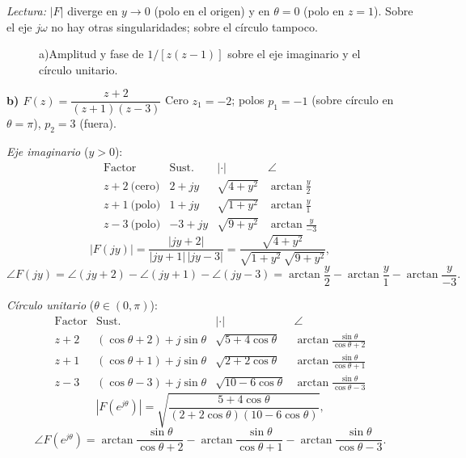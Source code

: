\documentclass[10pt,a4paper]{article}
\begin{document}
\noindent\textit{Lectura:} $|F|$ diverge en $y\to 0$ (polo en el origen) y en $\theta=0$ (polo en $z=1$). Sobre el eje $j\omega$ no hay otras singularidades; sobre el círculo tampoco.

\begin{figure}[H]\centering
	
	\caption{a)\enspace Amplitud y fase de $1/[z(z-1)]$ sobre el eje imaginario y el círculo unitario.}
	\label{fig:resp16a}
\end{figure}

\bigskip

\noindent\textbf{b) $F(z)=\dfrac{z+2}{(z+1)(z-3)}$}\;\textemdash\; Cero $z_1=-2$; polos $p_1=-1$ (sobre círculo en $\theta=\pi$), $p_2=3$ (fuera).

\medskip
\noindent\textit{Eje imaginario} ($y>0$):
\[
	\renewcommand{\arraystretch}{1.3}
	\begin{array}{l|c|c|c}
	\text{Factor} & \text{Sust.} & |\cdot| & \angle \\\hline
	z+2\ \text{(cero)}  & 2+jy  & \sqrt{4+y^2} & \arctan\tfrac{y}{2} \\
	z+1\ \text{(polo)}  & 1+jy  & \sqrt{1+y^2} & \arctan\tfrac{y}{1} \\
	z-3\ \text{(polo)}  & -3+jy & \sqrt{9+y^2} & \arctan\tfrac{y}{-3}
	\end{array}
\]
\[
	|F(jy)| = \frac{|jy+2|}{|jy+1|\,|jy-3|} = \frac{\sqrt{4+y^2}}{\sqrt{1+y^2}\,\sqrt{9+y^2}},
\]
\[
	\angle F(jy) = \angle(jy+2) - \angle(jy+1) - \angle(jy-3) = \arctan\!\frac{y}{2} - \arctan\!\frac{y}{1} - \arctan\!\frac{y}{-3}.
\]

\medskip
\noindent\textit{Círculo unitario} ($\theta\in(0,\pi)$):
\[
	\renewcommand{\arraystretch}{1.3}
	\begin{array}{l|c|c|c}
	\text{Factor} & \text{Sust.} & |\cdot| & \angle \\\hline
	z+2 & (\cos\theta+2)+j\sin\theta & \sqrt{5+4\cos\theta}  & \arctan\tfrac{\sin\theta}{\cos\theta+2} \\
	z+1 & (\cos\theta+1)+j\sin\theta & \sqrt{2+2\cos\theta}  & \arctan\tfrac{\sin\theta}{\cos\theta+1} \\
	z-3 & (\cos\theta-3)+j\sin\theta & \sqrt{10-6\cos\theta} & \arctan\tfrac{\sin\theta}{\cos\theta-3}
	\end{array}
\]
\[
	|F(e^{j\theta})| = \sqrt{\frac{5+4\cos\theta}{(2+2\cos\theta)(10-6\cos\theta)}},
\]
\[
	\angle F(e^{j\theta}) = \arctan\!\frac{\sin\theta}{\cos\theta+2} - \arctan\!\frac{\sin\theta}{\cos\theta+1} - \arctan\!\frac{\sin\theta}{\cos\theta-3}.
\]
\end{document}
